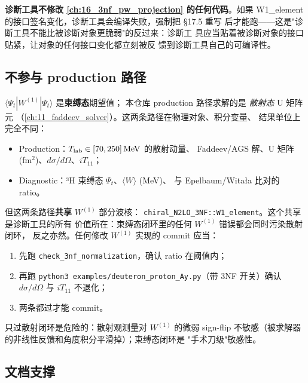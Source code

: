 \textbf{诊断工具不修改 \cref{ch:16_3nf_pw_projection} 的任何代码}。如果
W1\_element 的接口签名变化，诊断工具会编译失败，强制把 §17.5 重写
后才能跑——这是"诊断工具不能比被诊断对象更脆弱"的反过来：诊断工
具应当贴着被诊断对象的接口贴紧，让对象的任何接口变化都立刻被反
馈到诊断工具自己的可编译性。

\subsection{不参与 production 路径}
\label{subsec:ch17-not-production}

\(\langle\Psi_t|W^{(1)}|\Psi_t\rangle\) 是\textbf{束缚态}期望值；
本仓库 production 路径求解的是 \emph{散射态} U 矩阵元
（\cref{ch:11_faddeev_solver}）。这两条路径在物理对象、积分变量、
结果单位上完全不同：

\begin{itemize}
  \item Production：\({T_{\text{lab}}} \in [70, 250]\,\mathrm{MeV}\) 的散射动量、
        Faddeev/AGS 解、U 矩阵 (fm\(^2\))、\(d\sigma/d\Omega\)、\(iT_{11}\)；
  \item Diagnostic：³H 束缚态 \(\Psi_t\)、\(\langle W\rangle\) (MeV)、
        与 Epelbaum/Witała 比对的 ratio。
\end{itemize}

但这两条路径\textbf{共享} \(W^{(1)}\) 部分波核：
\texttt{chiral\_N2LO\_3NF::W1\_element}。这个共享是诊断工具的所有
价值所在：束缚态闭环里的任何 \(W^{(1)}\) 错误都会同时污染散射闭环，
反之亦然。任何修改 \(W^{(1)}\) 实现的 commit 应当：

\begin{enumerate}
  \item 先跑 \texttt{check\_3nf\_normalization}，确认 ratio 在阈值内；
  \item 再跑 \texttt{python3 examples/deuteron\_proton\_Ay.py}（带 3NF
        开关）确认 \(d\sigma/d\Omega\) 与 \(iT_{11}\) 不退化；
  \item 两条都过才能 commit。
\end{enumerate}

只过散射闭环是危险的：散射观测量对 \(W^{(1)}\) 的微弱 sign-flip
不敏感（被求解器的非线性反馈和角度积分平滑掉）；束缚态闭环是
"手术刀级"敏感性。

\subsection{文档支撑}
\label{subsec:ch17-docs}

